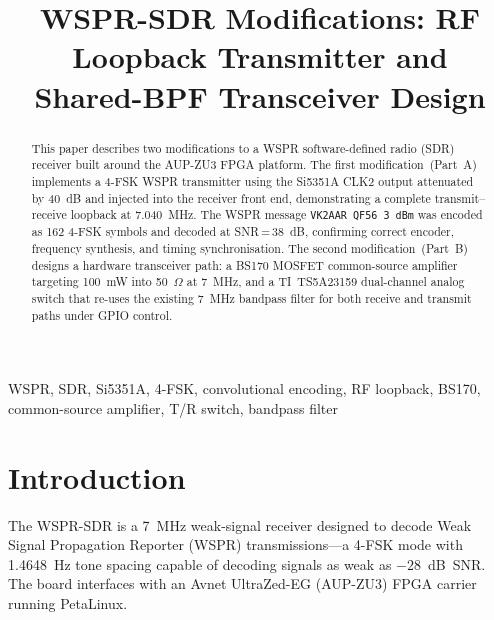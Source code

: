 \documentclass[conference]{IEEEtran}
\begin{document}
\title{WSPR-SDR Modifications: RF Loopback Transmitter and\\Shared-BPF Transceiver Design}

\author{
}

\maketitle

\begin{abstract}
This paper describes two modifications to a WSPR software-defined radio (SDR)
receiver built around the AUP-ZU3 FPGA platform. The first modification~(Part~A)
implements a 4-FSK WSPR transmitter using the Si5351A CLK2 output attenuated by
40~dB and injected into the receiver front end, demonstrating a complete
transmit--receive loopback at 7.040~MHz. The WSPR message \texttt{VK2AAR QF56 3~dBm}
was encoded as 162 4-FSK symbols and decoded at SNR\,=\,38~dB, confirming correct
encoder, frequency synthesis, and timing synchronisation. The second
modification~(Part~B) designs a hardware transceiver path: a BS170 MOSFET
common-source amplifier targeting 100~mW into 50~$\Omega$ at 7~MHz, and a
TI~TS5A23159 dual-channel analog switch that re-uses the existing 7~MHz bandpass
filter for both receive and transmit paths under GPIO control.
\end{abstract}

\begin{IEEEkeywords}
WSPR, SDR, Si5351A, 4-FSK, convolutional encoding, RF loopback, BS170,
common-source amplifier, T/R switch, bandpass filter
\end{IEEEkeywords}

\section{Introduction}

The WSPR-SDR is a 7~MHz weak-signal receiver designed to decode Weak Signal
Propagation Reporter (WSPR) transmissions---a 4-FSK mode with 1.4648~Hz tone
spacing capable of decoding signals as weak as $-28$~dB~SNR. The board interfaces
with an Avnet UltraZed-EG (AUP-ZU3) FPGA carrier running PetaLinux.
\end{document}
